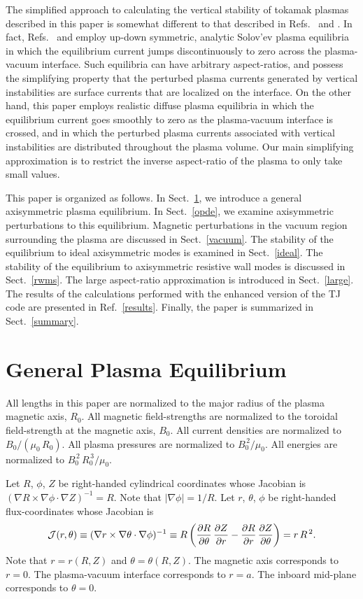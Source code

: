 \documentclass[12pt,prb,aps]{revtex4-1}
\begin{document}
The simplified approach to calculating the vertical stability of tokamak plasmas described in this paper is somewhat different to that described in Refs.~ and .
In fact, Refs.~ and  employ  up-down symmetric, analytic Solov'ev plasma equilibria in which the equilibrium  current jumps discontinuously to zero across the
plasma-vacuum interface. Such equilibria can have arbitrary aspect-ratios, and possess the simplifying property that the perturbed plasma currents generated by vertical instabilities are surface currents that
are localized on the interface. On the other hand, this paper employs realistic diffuse plasma equilibria in which the equilibrium current goes smoothly to zero as the plasma-vacuum interface is crossed,
and in which the perturbed plasma currents associated with vertical instabilities are distributed throughout the plasma volume. 
Our main simplifying approximation is to
restrict the inverse aspect-ratio  of the plasma to only take small values. 

This paper is organized as follows. In Sect.~\ref{geq}, we introduce a general axisymmetric plasma equilibrium. 
In Sect.~\ref{opde}, we examine axisymmetric perturbations to this equilibrium. Magnetic perturbations in the vacuum region
surrounding the plasma are discussed in Sect.~\ref{vacuum}. The stability of the equilibrium to ideal axisymmetric modes is
examined in Sect.~\ref{ideal}. The stability of the equilibrium to axisymmetric resistive wall modes is discussed in Sect.~\ref{rwms}. 
The large aspect-ratio approximation is introduced in Sect.~\ref{large}. The results of the calculations performed with the enhanced version of
the TJ code are presented in Ref.~\ref{results}. Finally, the paper is summarized in Sect.~\ref{summary}. 

\section{General Plasma Equilibrium}\label{geq}
All lengths  in this paper  are normalized to  the major radius of the plasma magnetic axis, $R_0$. All magnetic field-strengths
are normalized to the  toroidal field-strength at the magnetic axis, $B_0$. All current densities are normalized to $B_0/(\mu_0\,R_0)$. 
 All plasma pressures are normalized to $B_0^{\,2}/\mu_0$. All energies are normalized to $B_0^{\,2}\,R_0^{\,3}/\mu_0$. 

Let $R$, $\phi$, $Z$ be right-handed cylindrical coordinates whose Jacobian 
is
$(\nabla R\times \nabla\phi\cdot\nabla Z)^{-1} = R$. 
Note that $|\nabla\phi|=1/R$. 
Let $r$, $\theta$, $\phi$ be right-handed flux-coordinates whose
Jacobian is\,\cite{bussac,connor}
\begin{equation}\label{jac}
{\cal J}(r,\theta)\equiv (\nabla r\times \nabla\theta\cdot\nabla\phi)^{-1} \equiv R\left(\frac{\partial R}{\partial\theta}\,\frac{\partial Z}{\partial r} -\frac{\partial R}{\partial r}\,\frac{\partial Z}{\partial \theta}\right)= r\,R^{\,2}.
\end{equation}
Note that $r=r(R,Z)$ and $\theta=\theta(R,Z)$. 
The magnetic axis corresponds to $r=0$. The plasma-vacuum interface corresponds to $r=a$. The inboard mid-plane corresponds to $\theta=0$. 
\end{document}
